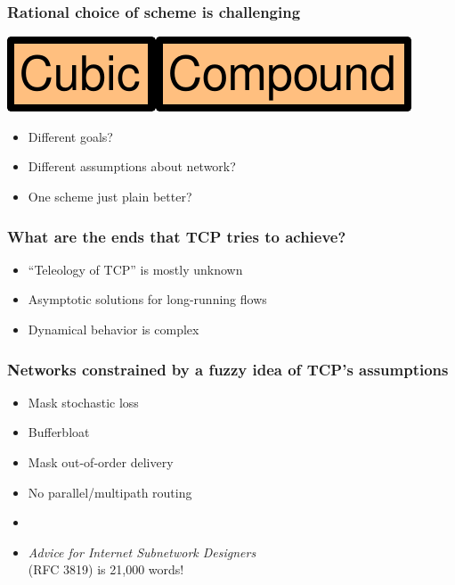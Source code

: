 \documentclass[svgnames]{beamer}
\newcommand{\ssline}{\vspace{8 pt}}
\begin{document}
\begin{frame}
\frametitle{Rational choice of scheme is challenging}

\begin{centering}
\includegraphics[height=20 pt]{cubic.pdf}\hspace{8 pt}{\bf vs.}\hspace{8 pt}\includegraphics[height=20 pt]{compound.pdf}

\end{centering}

\ssline
\ssline
\ssline

\begin{itemize}

\Large

\item Different goals?

\item Different assumptions about network?

\item One scheme just plain better?

\end{itemize}

\end{frame}

\begin{frame}
\frametitle{What are the ends that TCP tries to achieve?}

\begin{itemize}

\Large

\item ``Teleology of TCP'' is mostly unknown

\item Asymptotic solutions for long-running flows

\item Dynamical behavior is complex

\end{itemize}

\end{frame}

\begin{frame}
\frametitle{Networks constrained by a fuzzy idea of TCP's assumptions}

\Large

\begin{itemize}
\item Mask stochastic loss
\item Bufferbloat
\item Mask out-of-order delivery
\item No parallel/multipath routing
\item[]
\item[] {\it Advice for Internet Subnetwork Designers}\\ (RFC 3819) is 21,000 words!
\end{itemize}

\end{frame}
\end{document}
